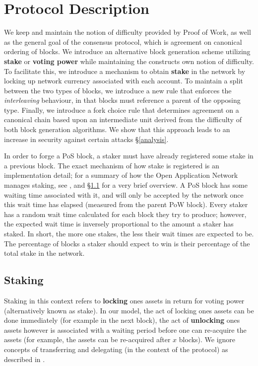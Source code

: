 \section{Protocol Description}
\label{unity}

We keep and maintain the notion of difficulty provided by Proof of Work, as well as the general goal of the consensus protocol, which is agreement on canonical ordering of blocks. We introduce an alternative block generation scheme utilizing \textbf{stake} or \textbf{voting power} while maintaining the constructs own notion of difficulty. To facilitate this, we introduce a mechanism to obtain \textbf{stake} in the network by locking up network currency associated with each account. To maintain a split between the two types of blocks, we introduce a new rule that enforces the \textit{interleaving} behaviour, in that blocks must reference a parent of the opposing type. Finally, we introduce a fork choice rule that determines agreement on a canonical chain based upon an intermediate unit derived from the difficulty of both block generation algorithms. We show that this approach leads to an increase in security against certain attacks \S\ref{analysis}.

In order to forge a PoS block, a staker must have already registered some stake in a previous block. The exact mechanism of how stake is registered is an implementation detail; for a summary of how the Open Application Network manages staking, see \cite{unity_design_spec}, and \S\ref{staking_mechanism} for a very brief overview. A PoS block has some waiting time associated with it, and will only be accepted by the network once this wait time has elapsed (measured from the parent PoW block). Every staker has a random wait time calculated for each block they try to produce; however, the expected wait time is inversely proportional to the amount a staker has staked. In short, the more one stakes, the less their wait times are expected to be. The percentage of blocks a staker should expect to win is their percentage of the total stake in the network.

\subsection{Staking}
\label{staking_mechanism}

Staking in this context refers to \textbf{locking} ones assets in return for voting power (alternatively known as stake). In our model, the act of locking ones assets can be done immediately (for example in the next block), the act of \textbf{unlocking} ones assets however is associated with a waiting period before one can re-acquire the assets (for example, the assets can be re-acquired after $x$ blocks). We ignore concepts of transferring and delegating (in the context of the protocol) as described in \cite{unity_design_spec}.

